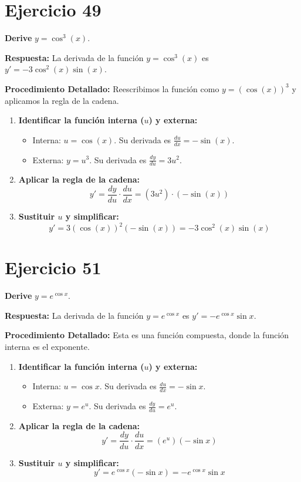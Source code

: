 \documentclass[12pt, a4paper]{article}
\begin{document}
\section{Ejercicio 49}
\textbf{Derive} $y=\cos^3(x)$.

\textbf{Respuesta:}
La derivada de la función $y=\cos^3(x)$ es $y'=-3\cos^2(x)\sin(x)$.

\textbf{Procedimiento Detallado:}
Reescribimos la función como $y=(\cos(x))^3$ y aplicamos la regla de la cadena.
\begin{enumerate}
    \item \textbf{Identificar la función interna ($u$) y externa:}
    \begin{itemize}
        \item Interna: $u=\cos(x)$. Su derivada es $\frac{du}{dx}=-\sin(x)$.
        \item Externa: $y=u^3$. Su derivada es $\frac{dy}{du}=3u^2$.
    \end{itemize}
    \item \textbf{Aplicar la regla de la cadena:}
    \[y'=\frac{dy}{du}\cdot\frac{du}{dx}=(3u^2)\cdot(-\sin(x))\]
    \item \textbf{Sustituir $u$ y simplificar:}
    \[y'=3(\cos(x))^2(-\sin(x))=-3\cos^2(x)\sin(x)\]
\end{enumerate}

\section{Ejercicio 51}
\textbf{Derive} $y=e^{\cos x}$.

\textbf{Respuesta:}
La derivada de la función $y=e^{\cos x}$ es $y'=-e^{\cos x}\sin x$.

\textbf{Procedimiento Detallado:}
Esta es una función compuesta, donde la función interna es el exponente.
\begin{enumerate}
    \item \textbf{Identificar la función interna ($u$) y externa:}
    \begin{itemize}
        \item Interna: $u=\cos x$. Su derivada es $\frac{du}{dx}=-\sin x$.
        \item Externa: $y=e^u$. Su derivada es $\frac{dy}{du}=e^u$.
    \end{itemize}
    \item \textbf{Aplicar la regla de la cadena:}
    \[y'=\frac{dy}{du}\cdot\frac{du}{dx}=(e^u)(-\sin x)\]
    \item \textbf{Sustituir $u$ y simplificar:}
    \[y'=e^{\cos x}(-\sin x)=-e^{\cos x}\sin x\]
\end{enumerate}
\end{document}
